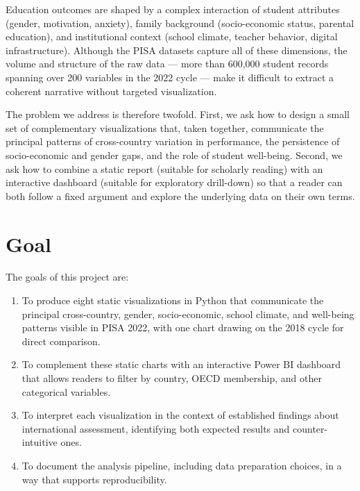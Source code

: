 \documentclass[conference]{IEEEtran}
\begin{document}
Education outcomes are shaped by a complex interaction of student attributes (gender, motivation, anxiety), family background (socio-economic status, parental education), and institutional context (school climate, teacher behavior, digital infrastructure). Although the PISA datasets capture all of these dimensions, the volume and structure of the raw data --- more than 600{,}000 student records spanning over 200 variables in the 2022 cycle --- make it difficult to extract a coherent narrative without targeted visualization.

The problem we address is therefore twofold. First, we ask how to design a small set of complementary visualizations that, taken together, communicate the principal patterns of cross-country variation in performance, the persistence of socio-economic and gender gaps, and the role of student well-being. Second, we ask how to combine a static report (suitable for scholarly reading) with an interactive dashboard (suitable for exploratory drill-down) so that a reader can both follow a fixed argument and explore the underlying data on their own terms.

\section{Goal}
\label{sec:goal}

The goals of this project are:
\begin{enumerate}
    \item To produce eight static visualizations in Python that communicate the principal cross-country, gender, socio-economic, school climate, and well-being patterns visible in PISA 2022, with one chart drawing on the 2018 cycle for direct comparison.
    \item To complement these static charts with an interactive Power BI dashboard that allows readers to filter by country, OECD membership, and other categorical variables.
    \item To interpret each visualization in the context of established findings about international assessment, identifying both expected results and counter-intuitive ones.
    \item To document the analysis pipeline, including data preparation choices, in a way that supports reproducibility.
\end{enumerate}
\end{document}
